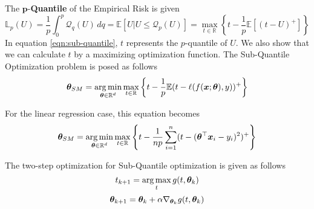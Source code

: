 \documentclass{article} %
\begin{document}
	The $\mathbf{p}$-\textbf{Quantile} of the Empirical Risk is given
	\begin{equation}\label{eqn:sub-quantile}
		\mathbb{L}_p(U) = \frac{1}{p}\int_0^p \mathcal{Q}_q(U)\,dq = \mathbb{E}\left[U|U \leq \mathcal{Q}_p(U) \right] = \max_{t\in \mathbb{R}}\left\{t - \frac{1}{p}\mathbb{E}\left[(t-U)^+\right]\right\}
	\end{equation}
	In equation \ref{eqn:sub-quantile}, $t$ represents the $p$-quantile of $U$. We also show that we can calculate $t$ by a maximizing optimization function. 
	The Sub-Quantile Optimization problem is posed as follows
	\begin{equation}
		{\bm{\theta}}_{SM} = \operatorname*{arg\,min}_{{\bm{\theta}} \in \mathbb{R}^d} \max_{t \in \mathbb{R}} \left\{t - \frac{1}{p}\mathbb{E}(t - \ell(f({\bm{x}};{\bm{\theta}}),y))^+\right\}
	\end{equation}
	
	For the linear regression case, this equation becomes 
	\begin{equation}
		\label{eqn:theta_sm}
		{\bm{\theta}}_{SM} = \operatorname*{arg\,min}_{{\bm{\theta}} \in \mathbb{R}^d} \max_{t \in \mathbb{R}} \left\{t - \frac{1}{np}\sum_{i=1}^n(t-({\bm{\theta}}^\top{\bm{x}}_i - y_i)^2)^+\right\}
	\end{equation}
		
	The two-step optimization for Sub-Quantile optimization is given as follows \vspace{1em}
	\begin{equation}
		\label{eqn:t-update}
		t_{k+1} = \operatorname*{arg\,max}_t g(t,{\bm{\theta}}_k) 
	\end{equation}
	\begin{equation}
		\label{eqn:theta-update}
		{\bm{\theta}}_{k+1} = {\bm{\theta}}_k + \alpha \nabla_{{\bm{\theta}}_k} g(t,{\bm{\theta}}_k)
	\end{equation}
		
\end{document}
